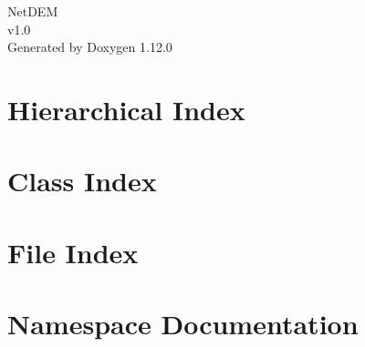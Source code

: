 \documentclass[twoside]{book}
\newcommand{\+}{\discretionary{\mbox{\scriptsize$\hookleftarrow$}}{}{}}
\newcommand{\clearemptydoublepage}{%
    \newpage{\pagestyle{empty}\cleardoublepage}%
  }
\begin{document}
  \raggedbottom
    \hypersetup{pageanchor=false,
                bookmarksnumbered=true,
                pdfencoding=unicode
               }
  \begin{titlepage}
  \vspace*{7cm}
  \begin{center}%
  {\Large Net\+DEM}\\
  [1ex]\large v1.\+0 \\
  \vspace*{1cm}
  {\large Generated by Doxygen 1.12.0}\\
  \end{center}
  \end{titlepage}
  \clearemptydoublepage
  \tableofcontents
  \clearemptydoublepage
  \hypersetup{pageanchor=true}

\chapter{Hierarchical Index}

\chapter{Class Index}

\chapter{File Index}

\chapter{Namespace Documentation}


\end{document}
